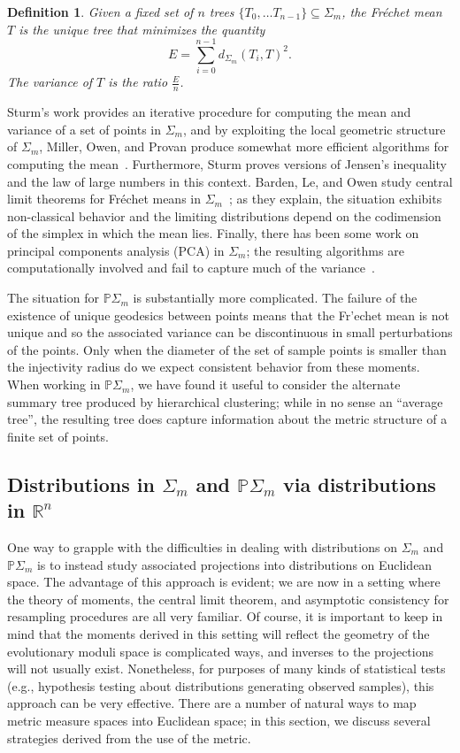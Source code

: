 \documentclass[a4paper,11pt]{article}
\newtheorem{definition}{Definition}
\begin{document}
\begin{definition}
Given a fixed set of $n$ trees $\{T_0, \ldots T_{n-1}\} \subseteq \Sigma_m$, the Fr\'echet mean $T$ is the unique tree that minimizes the quantity \[E = \sum_{i = 0}^{n-1} d_{\Sigma_m}(T_i, T)^2.\] 
The variance of $T$ is the ratio $\frac{E}{n}$.
\end{definition}

Sturm's work provides an iterative procedure for computing the mean and variance of a set of points in $\Sigma_m$, and by exploiting the local geometric structure of $\Sigma_m$, Miller, Owen, and Provan produce somewhat more efficient algorithms for computing the mean~\cite{miller2012polyhedral}.
Furthermore, Sturm proves versions of Jensen's inequality and the law of large numbers in this context.
Barden, Le, and Owen study central limit theorems for Fr\'echet means in $\Sigma_m$~\cite{barden2013mean}; as they explain, the situation exhibits non-classical behavior and the limiting distributions depend on the codimension of the simplex in which the mean lies.
Finally, there has been some work on principal components analysis (PCA) in $\Sigma_m$; the resulting algorithms are computationally involved and fail to capture much of the variance~\cite{Nye2011PCA}.

The situation for $\mathbb{P}\Sigma_m$ is substantially more complicated.
The failure of the existence of unique geodesics between points means that the Fr'echet mean is not unique and so the associated variance can be discontinuous in small perturbations of the points.
Only when the diameter of the set of sample points is smaller than the injectivity radius do we expect consistent behavior from these moments.
When working in $\mathbb{P}\Sigma_m$, we have found it useful to consider the alternate summary tree produced by hierarchical clustering; while in no sense an ``average tree'', the resulting tree does capture information about the metric structure of a finite set of points.

\subsection{Distributions in $\Sigma_m$ and $\mathbb{P}\Sigma_m$ via distributions in $\mathbb{R}^n$}

One way to grapple with the difficulties in dealing with distributions on $\Sigma_m$ and $\mathbb{P}\Sigma_m$ is to instead study associated projections into distributions on Euclidean space.
The advantage of this approach is evident; we are now in a setting where the theory of moments, the central limit theorem, and asymptotic consistency for resampling procedures are all very familiar.
Of course, it is important to keep in mind that the moments derived in this setting will reflect the geometry of the evolutionary moduli space is complicated ways, and inverses to the projections will not usually exist.
Nonetheless, for purposes of many kinds of statistical tests (e.g., hypothesis testing about distributions generating observed samples), this approach can be very effective.
There are a number of natural ways to map metric measure spaces into Euclidean space; in this section, we discuss several strategies derived from the use of the metric.
\end{document}

